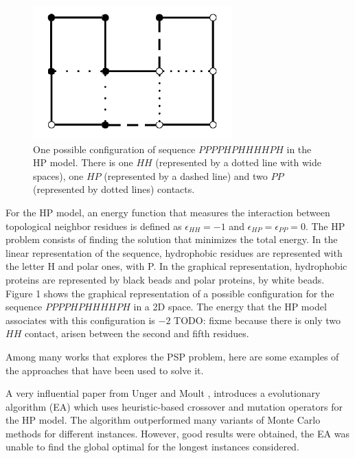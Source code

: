 \documentclass[conference]{IEEEtran}
\begin{document}
\begin{figure}[htb!] \label{fig:PROTEXAM}
	\centering
	\includegraphics[scale=0.7]{figures/proteinExample.png}
	\caption{One possible configuration of  sequence $PPPPHPHHHHPH$ in the HP model. There is one $HH$ (represented by a dotted line with wide spaces), one $HP$ (represented by a dashed line) and  two $PP$  (represented by dotted lines) contacts.}
\end{figure}




For the HP model, an energy function that  measures the interaction between topological  neighbor residues is defined  as  $\epsilon_{HH}=-1$ and $\epsilon_{HP}=\epsilon_{PP}=0$. The HP problem consists of finding the solution that minimizes the total energy. In the linear representation of the sequence, hydrophobic residues are represented with the letter H and polar ones, with P. In the graphical representation, hydrophobic proteins are represented  by black beads and polar proteins, by white beads.  Figure 1 shows the graphical representation of a possible configuration for  the sequence  $PPPPHPHHHHPH$ in a 2D space. The energy that the HP model associates with this configuration is $-2$ TODO: fixme because there is only two $HH$ contact, arisen between the second and fifth residues.


Among many works that explores the PSP problem, here are some examples of the approaches that have been used to solve it.

A very influential paper from Unger and Moult  \cite{unger1993genetic}, introduces a evolutionary algorithm (EA) which uses heuristic-based crossover and mutation operators for the HP model. The algorithm outperformed many variants of Monte Carlo methods for different instances. However,
good results were obtained, the EA was unable to find the global optimal for the longest instances considered.
\end{document}
